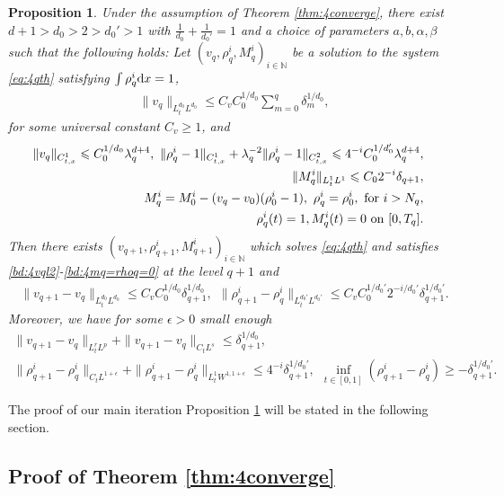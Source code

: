 \documentclass[UTF-8,reqno]{amsart}
\numberwithin{equation}{section}
\newtheorem{proposition}[theorem]{Proposition}
\theoremstyle{definition}
\def\dif{{\mathord{{\rm d}}}}
\def\mN{{\mathbb N}}
\def\geq{\geqslant}
\def\leq{\leqslant}
\def\dif{{\mathord{{\rm d}}}}
\def\bp{\begin{proposition}}
\def\ep{\end{proposition}}
\def\geq{\geqslant}
\def\leq{\leqslant}
\begin{document}
\bp\label{prop:case4} 
Under the assumption of Theorem \ref{thm:4converge}, there exist $d+1>d_0>2>d_0'>1$ with $\frac{1}{d_0}+\frac{1}{d_0'}=1$ and a choice of parameters $a,b,\alpha,\beta$  such
that the following holds: Let $(v_q,\rho^{i}_q,  M^{i}_q)_{i\in\mN}$ be a solution to the system \eqref{eq:4qth} satisfying  $\int\rho^{i}_q\dif x=1$,
\begin{align}\label{bd:4vql2}
\|v_q\|_{L^{d_0}_tL^{d_0}}\leq C_vC_0^{1/d_0}\sum_{m=0}^q\delta_{m}^{1/d_0},
\end{align}
for some universal constant $C_v\geq1$, and
\begin{align}
\|v_q\|_{C_{t,x}^1}\leq C_0^{1/d_0}\lambda_q^{d+4},\
  \|\rho^{i}_{q}-1\|_{C_{t,x}^1}+\lambda_q^{-2}\|\rho^{i}_{q}-1\|_{C_{t,x}^2}\leq 4^{-i}C_0^{1/d_0'}\lambda_q^{d+4},
\label{bd:4rhoqc1}\\
 \|M^{i}_q\|_{L^1_tL^1}\leq C_02^{-i}\delta_{q+1},&\label{bd:4rql1}\\
 M^{i}_{q}=M^{i}_{0}-(v_{q}-v_0)(\rho^{i}_0-1),\ \rho_q^{i}=\rho_0^{i}, \ {\rm for\ }  i>N_{q},\label{bd:4mqi>nq}\\
 \rho^{i}_q(t)=1, M^{i}_q(t)=0\ {\rm on}\ [0,T_q].&\label{bd:4mq=rhoq=0}
\end{align}
Then there exists 
$(v_{q+1},\rho^{i}_{q+1},  M^{i}_{q+1})_{i\in\mN}$ which solves \eqref{eq:4qth} and satisfies \eqref{bd:4vql2}-\eqref{bd:4mq=rhoq=0} at the level $q+1$ and
\begin{align}
\|v_{q+1}-v_{q}\|_{L^{d_0}_tL^{d_0}}\leq
C_vC_0^{1/d_0}\delta_{q+1}^{1/d_0},\label{bd:4vq+1-vqldd}\ \
\|\rho^{i}_{q+1}-\rho^{i}_{q}\|_{L^{d_0'}_tL^{d_0'}}\leq
C_v C_0^{1/{d_0'}}2^{-i/d_0'}\delta_{q+1}^{1/{d_0'}}.%
\end{align}
Moreover, we have for some $\epsilon>0$ small enough
\begin{align}
\|v_{q+1}-v_{q}\|_{L^{r}_tL^{p}}+\|v_{q+1}-v_q\|_{C_tL^s}\leq
\delta_{q+1}^{1/d_0},\label{bd:4vq+1-vqlpr}\\
\|\rho^{i}_{q+1}-\rho^{i}_{q}\|_{C_tL^{1+\epsilon}}+ \|\rho^{i}_{q+1}-\rho^{i}_{q}\|_{L_t^1W^{1,1+\epsilon}}\leq
4^{-i}\delta_{q+1}^{1/d_0'},\ \  \inf_{t\in [0,1]}(\rho^{i}_{q+1} - \rho^{i}_q)\geq - \delta_{q+1}^{1/d_0'} .\label{bd:4rhoq+1-rhoql1}
\end{align}
\ep


 The proof of our main iteration Proposition \ref{prop:case4} will be stated in the following section.


 
\subsection{Proof of   Theorem \ref{thm:4converge}}\label{sec:proofmaireuslt}
  
\end{document}
